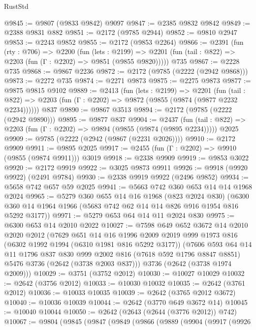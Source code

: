\begin{lexlean}{RustStd}
\begin{coremodule}
@9845 := @9807 (@9833 @9842) @9097
@9847 := @2385 @9832 @9842
@9849 := @2388 @9831 @882
@9851 := @2172 (@9785 @2944)
@9852 := @9810 @2947
@9853 := @2243 @9852
@9855 := @2172 (@9853 @2264)
@9866 := @2391
    (fun (rty : @706) =>
    @2200
      (fun (lets : @2199) =>
      @2201 (fun (tail : @822) => @2203 (fun (Γ : @2202) => @9851 (@9855 @9820)))))
    @735
@9867 := @2228 @735
@9868 := @9867 @2236
@9872 := @2172 (@9785 (@2222 (@2942 @9868)))
@9873 := @2272 @735
@9874 := @2271 @9873
@9875 := @2275 @9873
@9877 := @9875 @9815 @9102
@9889 := @2413
    (fun (lets : @2199) =>
    @2201
      (fun (tail : @822) => @2203 (fun (Γ : @2202) => @9872 (@9855 (@9874 (@9877 @2232 @2234))))))
    @837
@9890 := @9867 @3513
@9894 := @2172 (@9785 (@2222 (@2942 @9890)))
@9895 := @9877 @837
@9904 := @2437
    (fun (tail : @822) => @2203 (fun (Γ : @2202) => @9894 (@9855 (@9874 (@9895 @2234)))))
    @2025
@9909 := @9785 (@2222 (@2942 (@9867 (@2231 @2026))))
@9910 := @2172 @9909
@9911 := @9895 @2025
@9917 := @2455 (fun (Γ : @2202) => @9910 (@9855 (@9874 @9911))) @3019
@9918 := @2338 @9909
@9919 := @9853 @3022
@9920 := @2172 @9919
@9922 := @3025 @9873 @9911
@9926 := @9918 (@9920 @9922) (@2491 @9784)
@9930 := @2338 @9919 @9922 (@2496 @9852)
@9934 := @5658 @742 @657 @59 @2025
@9941 := @5663 @742 @360 @653 @14 @14 @1968 @2024
@9965 := @5279
    @360
    @655
    @14
    @16
    @1968
    (@823 @2024 @830)
    (@6300 @360 @14 @1964 @1966 (@5683 @742 @62 @14 @14 @826 @916 @1954 @816 @5292 @3177))
@9971 := @5279 @653 @64 @14 @11 @2024 @830
@9975 := @6300 @653 @14 @2010 @2022
@10027 := @7598
    @649
    @652
    @3672
    @14
    @2010
    @2020
    @2012
    (@7629
      @651
      @14
      @16
      @1996
      @2009
      @2019
      @999
      @1973
      @816
      (@6302 @1992 @1994 (@6310 @1981 @816 @5292 @3177))
      (@7606
        @593
        @64
        @14
        @11
        @1796
        @837
        @830
        @999
        @2002
        @816
        (@7618 @592 @1796 @8847 @8851)
        @5476
        @3736
        (@2642 (@3738 @2003 @837)))
      @3736
      (@2642 (@3738 @1974 @2009)))
@10029 := @3751 (@3752 @2012)
@10030 := @10027 @10029
@10032 := @2642 (@3756 @2012)
@10033 := @10030 @10032
@10035 := @2642 (@3761 @2012)
@10036 := @10033 @10035
@10039 := @2642 (@3765 @2012 @3672)
@10040 := @10036 @10039
@10044 := @2642 (@3770 @649 @3672 @14)
@10045 := @10040 @10044
@10050 := @2642 (@2643 (@2644 (@3776 @2012)) @742)
@10067 := @9804
    (@9845
      (@9847
        (@9849
          (@9866
            (@9889
              (@9904
                (@9917
                  (@9926

\end{coremodule}
\end{lexlean}
